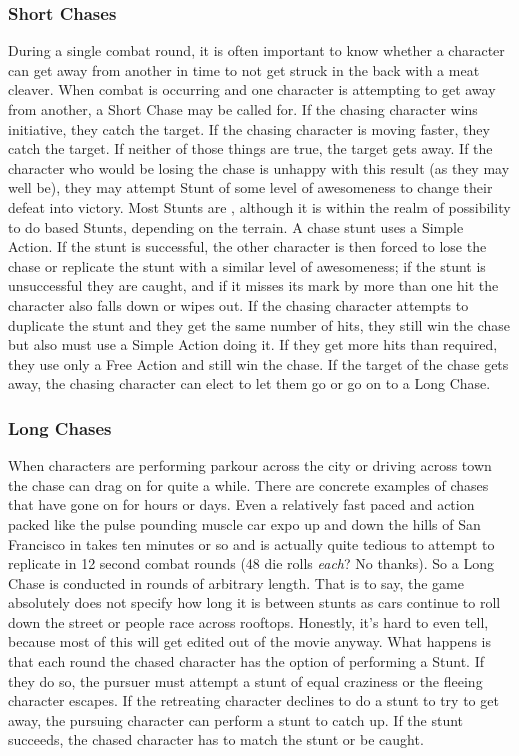 \subsubsection{Short Chases}\hspace{\parindent}  During a single combat round, it is often important to know whether a character can get away from another in time to not get struck in the back with a meat cleaver. When combat is occurring and one character is attempting to get away from another, a Short Chase may be called for. If the chasing character wins initiative, they catch the target. If the chasing character is moving faster, they catch the target. If neither of those things are true, the target gets away. If the character who would be losing the chase is unhappy with this result (as they may well be), they may attempt Stunt of some level of awesomeness to change their defeat into victory. Most Stunts are , although it is within the realm of possibility to do  based Stunts, depending on the terrain. A chase stunt uses a Simple Action. If the stunt is successful, the other character is then forced to lose the chase or replicate the stunt with a similar level of awesomeness; if the stunt is unsuccessful they are caught, and if it misses its mark by more than one hit the character also falls down or wipes out. If the chasing character attempts to duplicate the stunt and they get the same number of hits, they still win the chase but also must use a Simple Action doing it. If they get more hits than required, they use only a Free Action and still win the chase. If the target of the chase gets away, the chasing character can elect to let them go or go on to a Long Chase.

\subsubsection{Long Chases}\hspace{\parindent}  When characters are performing parkour across the city or driving across town the chase can drag on for quite a while. There are concrete examples of chases that have gone on for hours or days. Even a relatively fast paced and action packed like the pulse pounding muscle car expo up and down the hills of San Francisco in  takes ten minutes or so and is actually quite tedious to attempt to replicate in 12 second combat rounds (48 die rolls \textit{each}? No thanks). So a Long Chase is conducted in rounds of arbitrary length. That is to say, the game absolutely does not specify how long it is between stunts as cars continue to roll down the street or people race across rooftops. Honestly, it's hard to even tell, because most of this will get edited out of the movie anyway. What happens is that each round the chased character has the option of performing a Stunt. If they do so, the pursuer must attempt a stunt of equal craziness or the fleeing character escapes. If the retreating character declines to do a stunt to try to get away, the pursuing character can perform a stunt to catch up. If the stunt succeeds, the chased character has to match the stunt or be caught.

